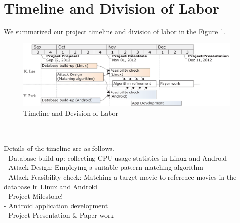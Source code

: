 \section{Timeline and Division of Labor}
\label{sec:timeline}
\indent We summarized our project timeline and division of labor in the Figure 1.\\
\vspace{-0.3in} 
\begin{figure}[!ht]
\centering
\includegraphics[scale=1]{Figures/Timeline}
\caption{Timeline and Devision of Labor}
\end{figure}\\
\\Details of the timeline are as follows. \\
- Database build-up: collecting CPU usage statistics in Linux and Android\\
- Attack Design: Employing a suitable pattern matching algorithm\\
- Attack Feasibility check: Matching a target movie to reference movies in the database in Linux and Android \\
- Project Milestone!\\
- Android application development\\
- Project Presentation \& Paper work
